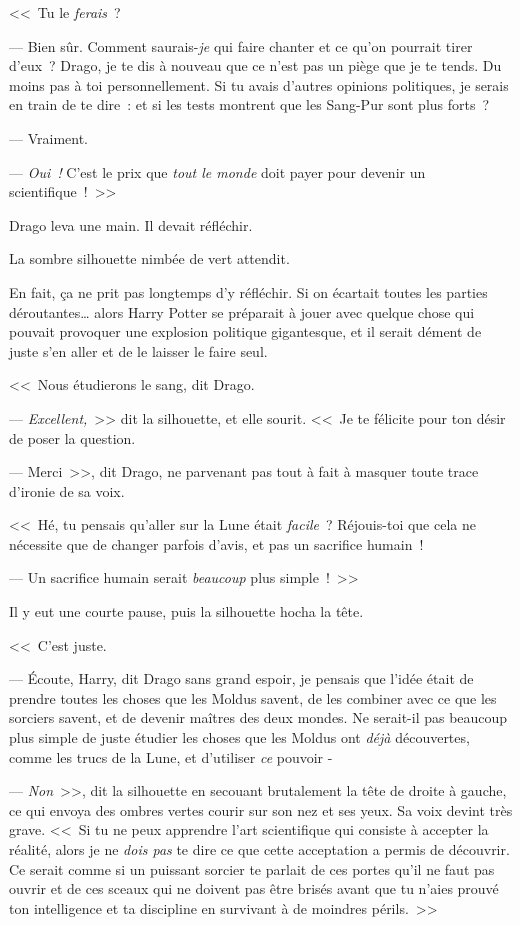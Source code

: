 <<~Tu le \emph{ferais}~?

--- Bien sûr. Comment saurais-\emph{je} qui faire chanter et ce qu'on pourrait tirer d'eux~? Drago, je te dis à nouveau que ce n'est pas un piège que je te tends. Du moins pas à toi personnellement. Si tu avais d'autres opinions politiques, je serais en train de te dire~: et si les tests montrent que les Sang-Pur sont plus forts~?

--- Vraiment.

--- \emph{Oui~!} C'est le prix que \emph{tout le monde} doit payer pour devenir un scientifique~!~>>

Drago leva une main. Il devait réfléchir.

La sombre silhouette nimbée de vert attendit.

En fait, ça ne prit pas longtemps d'y réfléchir. Si on écartait toutes les parties déroutantes… alors Harry Potter se préparait à jouer avec quelque chose qui pouvait provoquer une explosion politique gigantesque, et il serait dément de juste s'en aller et de le laisser le faire seul.

<<~Nous étudierons le sang, dit Drago.

--- \emph{Excellent,}~>> dit la silhouette, et elle sourit. <<~Je te félicite pour ton désir de poser la question.

--- Merci~>>, dit Drago, ne parvenant pas tout à fait à masquer toute trace d'ironie de sa voix.

<<~Hé, tu pensais qu'aller sur la Lune était \emph{facile}~? Réjouis-toi que cela ne nécessite que de changer parfois d'avis, et pas un sacrifice humain~!

--- Un sacrifice humain serait \emph{beaucoup} plus simple~!~>>

Il y eut une courte pause, puis la silhouette hocha la tête.

<<~C'est juste.

--- Écoute, Harry, dit Drago sans grand espoir, je pensais que l'idée était de prendre toutes les choses que les Moldus savent, de les combiner avec ce que les sorciers savent, et de devenir maîtres des deux mondes. Ne serait-il pas beaucoup plus simple de juste étudier les choses que les Moldus ont \emph{déjà} découvertes, comme les trucs de la Lune, et d'utiliser \emph{ce} pouvoir -

--- \emph{Non}~>>, dit la silhouette en secouant brutalement la tête de droite à gauche, ce qui envoya des ombres vertes courir sur son nez et ses yeux. Sa voix devint très grave. <<~Si tu ne peux apprendre l'art scientifique qui consiste à accepter la réalité, alors je ne \emph{dois pas} te dire ce que cette acceptation a permis de découvrir. Ce serait comme si un puissant sorcier te parlait de ces portes qu'il ne faut pas ouvrir et de ces sceaux qui ne doivent pas être brisés avant que tu n'aies prouvé ton intelligence et ta discipline en survivant à de moindres périls.~>>


